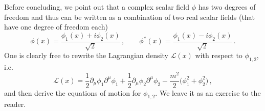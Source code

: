 \begin{sol}
    Before concluding, we point out that a complex scalar field $\phi$ has two degrees of freedom and thus can be written as a combination of two real scalar fields (that have one degree of freedom each)
    \begin{equation}
        \phi(x) = \frac{\phi_1(x) + i \phi_2(x)}{\sqrt{2}} \, , 
        \qquad 
        \phi^*(x) = \frac{\phi_1(x) - i \phi_2(x)}{\sqrt{2}} \, .
    \end{equation}
    One is clearly free to rewrite the Lagrangian density $\mathcal{L}(x)$ with respect to $\phi_{1,2}$, i.e.
    \begin{equation}
        \mathcal{L}(x) = \frac{1}{2} \partial_\mu \phi_1 \partial^\mu \phi_1 + \frac{1}{2} \partial_\mu \phi_2 \partial^\mu \phi_2 - \frac{m^2}{2} \big(\phi_1^2 + \phi_2^2\big) \, ,
    \end{equation}
    and then derive the equations of motion for $\phi_{1,2}$. We leave it as an exercise to the reader.  
\end{sol}
